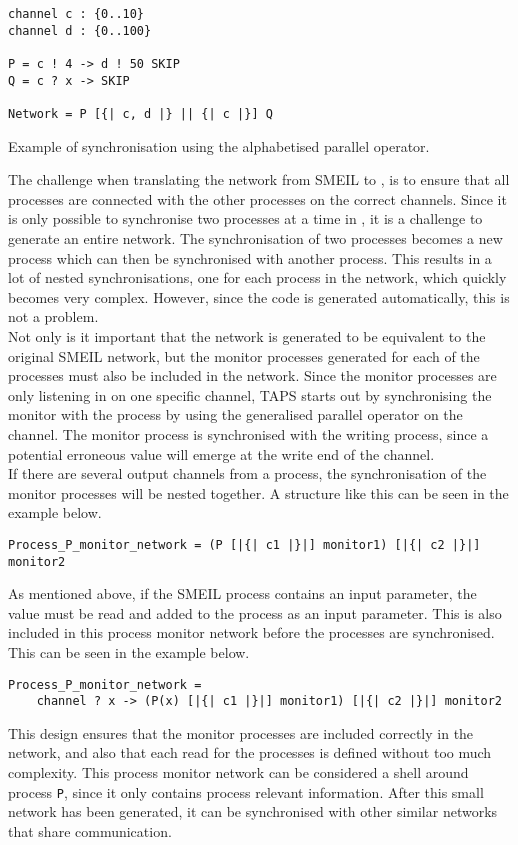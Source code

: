 \begin{listing}
\begin{verbatim}
channel c : {0..10}
channel d : {0..100}

P = c ! 4 -> d ! 50 SKIP
Q = c ? x -> SKIP

Network = P [{| c, d |} || {| c |}] Q
\end{verbatim}
\caption{Example of synchronisation using the alphabetised parallel operator.}
\label{lst:alphabetised_parallel_operator}
\end{listing}

The challenge when translating the network from SMEIL to \cspm{}, is to ensure that all processes are connected with the other processes on the correct channels.
Since it is only possible to synchronise two processes at a time in \cspm{}, it is a challenge to generate an entire network. The synchronisation of two processes becomes a new process which can then be synchronised with another process. This results in a lot of nested synchronisations, one for each process in the network, which quickly becomes very complex. However, since the \cspm{} code is generated automatically, this is not a problem.\\

Not only is it important that the network is generated to be equivalent to the original SMEIL network, but the monitor processes generated for each of the \cspm{} processes must also be included in the network. Since the monitor processes are only listening in on one specific channel, TAPS starts out by synchronising the monitor with the process by using the generalised parallel operator on the channel. The monitor process is synchronised with the writing process, since a potential erroneous value will emerge at the write end of the channel.\\

If there are several output channels from a process, the synchronisation of the monitor processes will be nested together. A structure like this can be seen in the example below.
\begin{verbatim}
Process_P_monitor_network = (P [|{| c1 |}|] monitor1) [|{| c2 |}|] monitor2
\end{verbatim}
As mentioned above, if the SMEIL process contains an input parameter, the value must be read and added to the process as an input parameter. This is also included in this process monitor network before the processes are synchronised. This can be seen in the example below.
\begin{verbatim}
Process_P_monitor_network =
    channel ? x -> (P(x) [|{| c1 |}|] monitor1) [|{| c2 |}|] monitor2
\end{verbatim}
This design ensures that the monitor processes are included correctly in the network, and also that each read for the processes is defined without too much complexity. This process monitor network can be considered a shell around process \texttt{P}, since it only contains process relevant information. After this small network has been generated, it can be synchronised with other similar networks that share communication.\\


